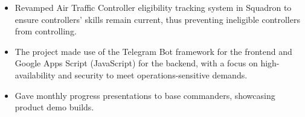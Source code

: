 \begin{itemize}
\item Revamped Air Traffic Controller eligibility tracking system in Squadron to ensure controllers’ skills remain current, thus preventing ineligible controllers from controlling. 
\item The project made use of the Telegram Bot framework for the frontend and Google Apps Script (JavaScript) for the backend, with a focus on high-availability and security to meet operations-sensitive demands.
\item Gave monthly progress presentations to base commanders, showcasing product demo builds.
\end{itemize}